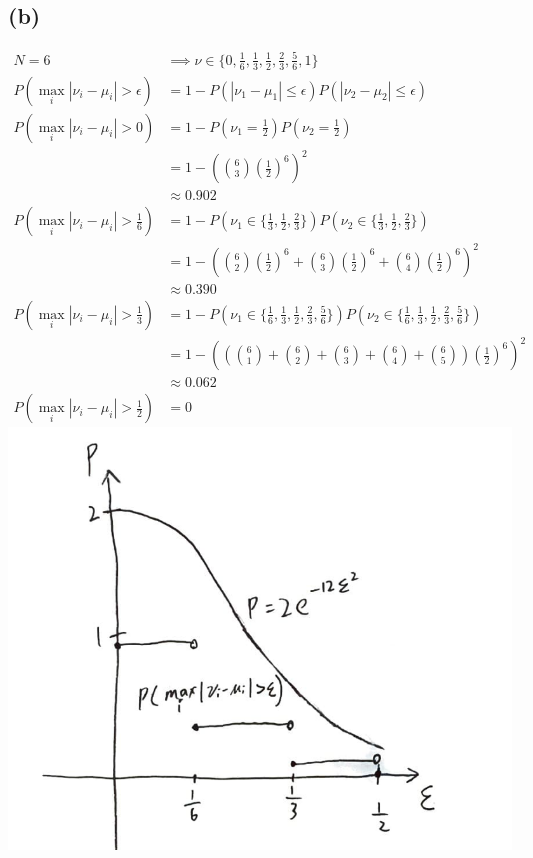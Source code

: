 \documentclass{article}
\begin{document}
	\subsection*{(b)}
		\begin{align*}
			N = 6 &\implies \nu \in \{0, \frac16, \frac13, \frac12, \frac23, \frac56, 1\}\\
			P(\max\limits_i|\nu_i - \mu_i| > \epsilon) &= 1 - P(|\nu_1 - \mu_1| \leq \epsilon)P(|\nu_2 - \mu_2| \leq \epsilon)\\
			P(\max\limits_i|\nu_i - \mu_i| > 0) &= 1 - P(\nu_1 = \frac12)P(\nu_2 = \frac12)\\
			&= 1 - ({6 \choose 3}(\frac12)^6)^2\\
			&\approx 0.902\\
			P(\max\limits_i|\nu_i - \mu_i| > \frac16) &= 1 - P(\nu_1 \in \{\frac13, \frac12, \frac23\})P(\nu_2 \in \{\frac13, \frac12, \frac23\})\\
			&= 1 - ({6\choose 2}(\frac12)^6 + {6 \choose 3}(\frac12)^6 + {6 \choose 4}(\frac12)^6)^2\\
			&\approx 0.390\\
			P(\max\limits_i|\nu_i - \mu_i| > \frac13) &= 1 - P(\nu_1 \in \{\frac16, \frac13, \frac12, \frac23, \frac56\})P(\nu_2 \in \{\frac16, \frac13, \frac12, \frac23, \frac56\})\\
			&= 1 - (({6 \choose 1} + {6\choose 2} + {6 \choose 3} + {6 \choose 4} + {6 \choose 5})(\frac12)^6)^2\\
			&\approx 0.062\\
			P(\max\limits_i|\nu_i - \mu_i| > \frac12) &= 0
		\end{align*}
		\includegraphics[scale=0.4]{p1.7b.png}
\end{document}
